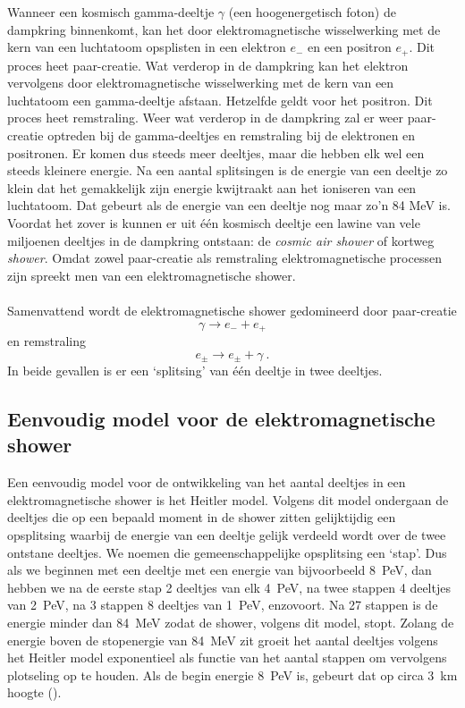 Wanneer een kosmisch gamma-deeltje $\gamma$ (een hoogenergetisch foton)
de dampkring binnenkomt, kan het door elektromagnetische wisselwerking
met de kern van een luchtatoom opsplisten in een elektron $e_{-}$ en een
positron $e_{+}$. Dit proces heet paar-creatie. Wat verderop in de
dampkring kan het elektron vervolgens door elektromagnetische
wisselwerking met de kern van een luchtatoom een gamma-deeltje afstaan.
Hetzelfde geldt voor het positron. Dit proces heet remstraling. Weer wat
verderop in de dampkring zal er weer paar-creatie optreden bij de
gamma-deeltjes en remstraling bij de elektronen en positronen. Er komen
dus steeds meer deeltjes, maar die hebben elk wel een steeds kleinere
energie. Na een aantal splitsingen is de energie van een deeltje zo
klein dat het gemakkelijk zijn energie kwijtraakt aan het ioniseren van
een luchtatoom. Dat gebeurt als de energie van een deeltje nog maar zo'n
84 MeV is. Voordat het zover is kunnen er uit \'e\'en kosmisch deeltje
een lawine van vele miljoenen deeltjes in de dampkring ontstaan: de
\emph{cosmic air shower} of kortweg \emph{shower}. Omdat zowel
paar-creatie als remstraling elektromagnetische processen zijn spreekt
men van een elektromagnetische shower. 
\\ \\
Samenvattend wordt de elektromagnetische shower gedomineerd door paar-creatie
\begin{equation}
\gamma \rightarrow e_{-} + e_{+} \nonumber
\end{equation}
en remstraling
\begin{equation} 
e_{\pm} \rightarrow e_{\pm} + \gamma \ . \nonumber
\end{equation}
In beide gevallen is er een `splitsing' van één deeltje in twee deeltjes.  


\subsection{Eenvoudig model voor de elektromagnetische shower}

Een eenvoudig model voor de ontwikkeling van het aantal deeltjes in een
elektromagnetische shower is het Heitler model. Volgens dit model
ondergaan de deeltjes die op een bepaald moment in de shower zitten
gelijktijdig een opsplitsing waarbij de energie van een deeltje gelijk
verdeeld wordt over de twee ontstane deeltjes. We noemen die
gemeenschappelijke opsplitsing een `stap'. Dus als we beginnen met een
deeltje met een energie van bijvoorbeeld \SI{8}{\peta\electronvolt}, dan
hebben we na de eerste stap 2 deeltjes van elk
\SI{4}{\peta\electronvolt}, na twee stappen 4 deeltjes van
\SI{2}{\peta\electronvolt}, na 3 stappen 8 deeltjes van
\SI{1}{\peta\electronvolt}, enzovoort. Na 27 stappen is de energie
minder dan \SI{84}{\mega\electronvolt} zodat de shower, volgens dit
model, stopt. Zolang de energie boven de stopenergie van
\SI{84}{\mega\electronvolt} zit groeit het aantal deeltjes volgens het
Heitler model exponentieel als functie van het aantal stappen om
vervolgens plotseling op te houden. Als de begin energie
\SI{8}{\peta\electronvolt} is, gebeurt dat op circa \SI{3}{\km} hoogte
(). 

